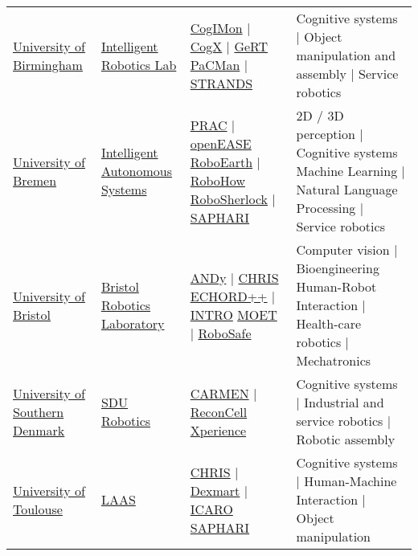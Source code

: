 \begin{table}[H]
\begin{tabu} { X[m,c] X[0.9,m,c] X[1.2,m,c] X[1.8,m,c] }
		\tabucline[1pt on 1.5pt off 3pt]{-}
		\href{http://www.birmingham.ac.uk}{University of Birmingham} &
		\href{https://www.cs.bham.ac.uk/research/groupings/robotics/}{Intelligent Robotics Lab} &
		\href{https://cogimon.eu}{CogIMon} | \href{https://www.cs.bham.ac.uk/research/groupings/robotics/projects/cogx}{CogX} | \href{https://www.cs.bham.ac.uk/~rwd/research/gert-main.php}{GeRT} \href{http://www.pacman-project.eu/}{PaCMan} | \href{http://strands.acin.tuwien.ac.at/}{STRANDS} &
		Cognitive systems | Object manipulation and assembly | Service robotics \\

		\tabucline[1pt on 1.5pt off 3pt]{-}
		\href{http://www.uni-bremen.de/en.html}{University of Bremen} &
		\href{http://ai.uni-bremen.de/research/ias}{Intelligent Autonomous Systems} &
		\href{http://www.actioncores.org/}{PRAC} | \href{http://www.open-ease.org/}{openEASE} \href{http://roboearth.org/}{RoboEarth} | \href{https://robohow.eu}{RoboHow} \href{http://www.robosherlock.org/}{RoboSherlock} | \href{http://www.saphari.eu}{SAPHARI} &
		2D / 3D perception | Cognitive systems Machine Learning | Natural Language Processing | Service robotics \\

		\tabucline[1pt on 1.5pt off 3pt]{-}
		\href{http://www.bristol.ac.uk}{University of Bristol} &
		\href{http://www.brl.ac.uk/}{Bristol Robotics Laboratory} &
		\href{http://www.brl.ac.uk/research/researchthemes/nonlinearcontrolinrobotics/anthropomorphicdynamics.aspx}{ANDy} | \href{http://www.chrisfp7.eu/}{CHRIS} \href{http://echord.eu/}{ECHORD++} | \href{http://introbotics.eu/}{INTRO} \href{http://www.brl.ac.uk/research/researchthemes/robotvision/moetmanipulationofobjects.aspx}{MOET} | \href{http://www.robosafe.org/}{RoboSafe} &
		Computer vision | Bioengineering Human-Robot Interaction | Health-care robotics | Mechatronics \\

		\tabucline[1pt on 1.5pt off 3pt]{-}
		\href{http://www.sdu.dk/en}{University of Southern Denmark} &
		\href{http://www.sdu.dk/en/om_sdu/institutter_centre/sdurobotics}{SDU Robotics} &
		\href{http://caro.sdu.dk/index.php/projects/projectslist?view=project\&task=show\&id=6}{CARMEN} | \href{http://www.reconcell.eu/}{ReconCell} \href{http://www.xperience.org/}{Xperience} &
		Cognitive systems | Industrial and service robotics | Robotic assembly \\

		\tabucline[1pt on 1.5pt off 3pt]{-}
		\href{http://en.univ-toulouse.fr}{University of Toulouse} &
		\href{https://www.laas.fr/public/en/laboratory-presentation}{LAAS} &
		\href{http://www.chrisfp7.eu/}{CHRIS} | \href{http://www.dexmart.eu}{Dexmart} | \href{http://www.agence-nationale-recherche.fr/?Project=ANR-10-CORD-0025}{ICARO} \href{http://www.saphari.eu/}{SAPHARI} &
		Cognitive systems | Human-Machine Interaction | Object manipulation \\
	\end{tabu}
	\label{tab:label}
\end{table}



